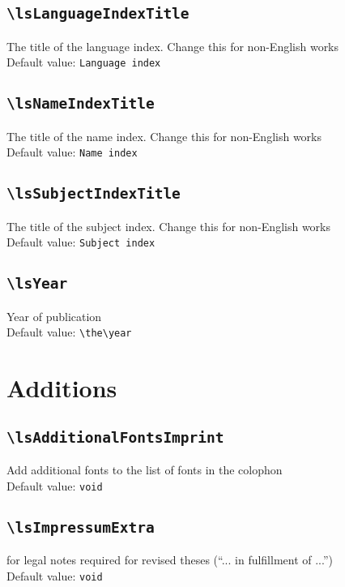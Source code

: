 \documentclass[output=guidelines]{langscibook}
\newcommand{\option}[3]{\subsection{\texttt{#1}}{#2}\\Default value: {\texttt{#3}}}
\begin{document}
\option{{\textbackslash}lsLanguageIndexTitle}{The title of the language index. Change this for non-English works}{Language index}
\option{{\textbackslash}lsNameIndexTitle}{The title of the name index. Change this for non-English works}{Name index}
\option{{\textbackslash}lsSubjectIndexTitle}{The title of the subject index. Change this for non-English works}{Subject index}
\option{{\textbackslash}lsYear}{Year of publication}{{\textbackslash}the{\textbackslash}year}

\section{Additions}
\option{{\textbackslash}lsAdditionalFontsImprint}{Add additional fonts to the list of fonts in the colophon}{\textrm{void}}
\option{{\textbackslash}lsImpressumExtra}{for legal notes required for revised theses (``... in fulfillment of ...'')}{void}
\end{document}
